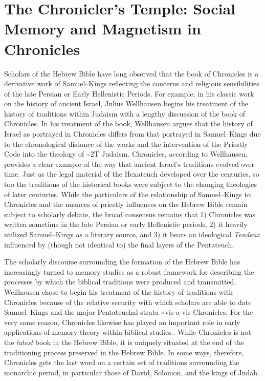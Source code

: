 \hypertarget{the-chroniclers-temple-social-memory-and-magnetism-in-chronicles}{%
\chapter{The Chronicler's Temple: Social Memory and Magnetism in
Chronicles}\label{the-chroniclers-temple-social-memory-and-magnetism-in-chronicles}}

Scholars of the Hebrew Bible have long observed that the book of
Chronicles is a derivative work of Samuel--Kings reflecting the concerns
and religious sensibilities of the late Persian or Early Hellenistic
Periods. For example, in his classic work on the history of ancient
Israel, Julius Wellhausen begins his treatment of the history of
traditions within Judaism with a lengthy discussion of the book of
Chronicles. In his treatment of the book, Wellhausen argues that the
history of Israel as portrayed in Chronicles differs from that portrayed
in Samuel--Kings due to the chronological distance of the works and the
intervention of the Priestly Code into the theology of
\textasciitilde{}2T Judaism.\autocites[171--172]{wellhausen1957}[See
also][]{wright_ulrich-wright1992} Chronicles, according to Wellhausen,
provides a clear example of the way that ancient Israel's traditions
evolved over time. Just as the legal material of the Hexateuch developed
over the centuries, so too the traditions of the historical books were
subject to the changing theologies of later centuries. While the
particulars of the relationship of Samuel--Kings to Chronicles and the
nuances of priestly influences on the Hebrew Bible remain subject to
scholarly debate, the broad consensus remains that 1) Chronicles was
written sometime in the late Persian or early Hellenistic periods, 2) it
heavily utilized Samuel--Kings as a literary source, and 3) it bears an
ideological \emph{Tendenz} influenced by (though not identical to) the
final layers of the Pentateuch.\autocites[For a thorough and reasonably
recent summary of the \emph{status questionis},
see][72--89]{knoppers2003}[See
also][]{japhet1993}{japhet2009}{braun1986}[and][]{coggins1976}

The scholarly discourse surrounding the formation of the Hebrew Bible
has increasingly turned to memory studies as a robust framework for
describing the processes by which the biblical traditions were produced
and
transmitted.\autocites{wright2014}{blenkinsopp2013}{rogerson2010}{davies2008}{hendel2005}{smith_cbq2002}
Wellhausen chose to begin his treatment of the history of traditions
with Chronicles because of the relative security with which scholars are
able to date Samuel--Kings and the major Pentateuchal strata
\textasciitilde{}vis-a-vis Chronicles. For the very same reason,
Chronicles likewise has played an important role in early applications
of memory theory within biblical
studies.\autocites{benzvi_st2017}{benzvi-a_evans-williams2013}{benzvi-b_evans-williams2013}.
While Chronicles is not the \emph{latest} book in the Hebrew Bible, it
is uniquely situated at the end of the traditioning process preserved in
the Hebrew Bible. In some ways, therefore, Chronicles gets the last word
on a certain set of traditions surrounding the monarchic period, in
particular those of David, Solomon, and the kings of Judah.


